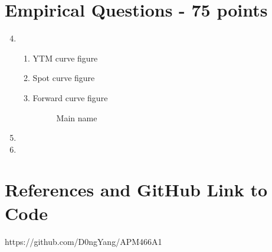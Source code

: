 \documentclass{article}
\begin{document}
\section*{Empirical Questions - 75 points} 

\begin{enumerate}
\setcounter{enumi}{3} 
    \item \hfill
    \begin{enumerate}
        \item  YTM curve figure
        \item Spot curve figure
        \item Forward curve figure
   
    \begin{figure}
\centering 
{}
\caption{Main name}
\label{Fig.main}
\end{figure}

\end{enumerate}
   
    \item 
    \item 
\end{enumerate}

\section*{References and GitHub Link to Code}
https://github.com/D0ngYang/APM466A1
\end{document}
